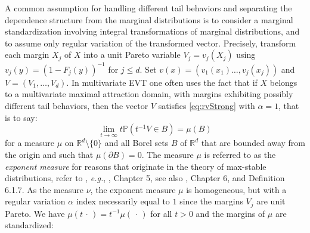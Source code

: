 \documentclass{article}
\numberwithin{equation}{section}
\renewcommand{\P}{\mathbb{P}}
\newcommand{\E}{\mathbb{E}}
\newcommand{\Measures}{\mathcal{M}}  %
\newcommand{\Mz}{\Measures_0}  %
\newcommand{\rset}{\mathbb{R}}
\newcommand{\point}{\,\cdot\,}
\newcommand{\PP}{\P}%
\newcommand{\EE}{\E}%
\newcommand{\ud}{\,\mathrm{d}}
\begin{document}
A common assumption for handling different tail behaviors
and separating the dependence structure from the marginal distributions is to
consider a marginal standardization involving integral transformations of marginal distributions, and to assume only regular variation of the transformed vector.
Precisely, transform each margin $X_j$ of $X$ into a unit Pareto variable $V_j = v_j(X_j)$ using $v_j(y) = (1 - F_j(y))^{-1}$ for $j\le d$. Set  $v(x) = (v_1(x_1)\ldots, v_j(x_j))$ and $V = (V_1,\ldots, V_d)$. In multivariate EVT one often uses the fact that if $X$ belongs to a multivariate maximal attraction domain, with margins exhibiting possibly different tail behaviors, then the vector $V$ satisfies \eqref{eq:rvStrong} with $\alpha=1$, that is to say:
\begin{equation}
    \label{eq:standardRV}
    \lim_{t \to \infty} t\PP\left(t^{-1} V \in B\right) = \mu(B)
\end{equation}
for a measure $\mu$ on $\mathbb{R}^d\setminus \{0\}$ and all Borel sets $B$ of $\rset^d$ that are bounded away from the origin and such
that $\mu(\partial B) = 0$. The measure $\mu$ is referred to as the \emph{exponent measure}
for reasons that originate in the theory of max-stable distributions,  refer to , \emph{e.g.}, \cite{resnick2008extreme}, Chapter 5, see also \cite{de2007extreme}, Chapter 6, and Definition 6.1.7. 
As the measure $\nu$, the exponent measure $\mu$ is homogeneous, but with a regular variation $\alpha$ index necessarily equal to $1$ since the margins $V_j$ are unit Pareto. We have $\mu(t\point) = t^{-1}\mu(\point)$ for all $t>0$ and the margins of $\mu$ are standardized: 
\end{document}
